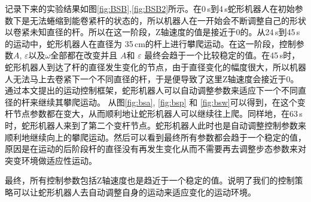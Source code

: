 记录下来的实验结果如图\ref{fig:BSB},\ref{fig:BSB2}所示。在0\,s到4\,s蛇形机器人在初始参数下是无法蜷缩到能卷紧杆的状态的，所以机器人在一开始会不断调整自己的形状以卷紧未知直径的杆。所以在这一阶段，Z轴速度的值是接近于0的。从24\,s到45\,s的运动中，蛇形机器人在直径为 35\,cm的杆上进行攀爬运动。在这一阶段，控制参数$A$, $\varepsilon$以及$\omega$全部都在改变并且 $A$和 $\varepsilon$ 最终会趋于一个比较稳定的值。在45\,s时，蛇形机器人到达了杆的直径发生变化的节点，由于直径变化的幅度很大，所以机器人无法马上去卷紧下一个不同直径的杆，于是便导致了这里Z轴速度会接近于0。通过本文提出的运动控制框架，蛇形机器人可以自动调整参数来适应下一个不同直径的杆来继续其攀爬运动。 从图\ref{fig:bsa}, \ref{fig:bsp} 和 \ref{fig:bsw}可以得到，在这个变杆节点参数都在变大，从而顺利地让蛇形机器人可以继续往上爬。同样地，在63\,s时，蛇形机器人来到了第二个变杆节点。蛇形机器人此时也是自动调整控制参数来顺利地继续向上的攀爬运动。然后可以看到最终所有参数都会趋于一个稳定的值，原因是在运动的后阶段杆的直径没有再发生变化从而不需要再去调整步态参数来对突变环境做适应性运动。

最终，所有控制参数包括Z轴速度也是趋近于一个稳定的值。说明了我们的控制策略可以让蛇形机器人去自动调整自身的运动来适应变化的运动环境。

